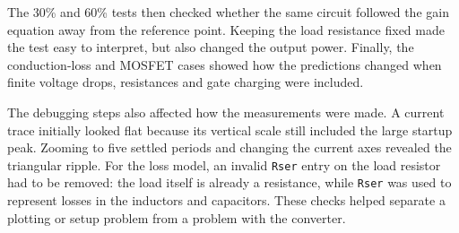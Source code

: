 \documentclass[11pt,a4paper]{article}
\begin{document}
The 30\% and 60\% tests then checked whether the same circuit followed the gain equation away from the reference point. Keeping the load resistance fixed made the test easy to interpret, but also changed the output power. Finally, the conduction-loss and MOSFET cases showed how the predictions changed when finite voltage drops, resistances and gate charging were included.

The debugging steps also affected how the measurements were made. A current trace initially looked flat because its vertical scale still included the large startup peak. Zooming to five settled periods and changing the current axes revealed the triangular ripple. For the loss model, an invalid \texttt{Rser} entry on the load resistor had to be removed: the load itself is already a resistance, while \texttt{Rser} was used to represent losses in the inductors and capacitors. These checks helped separate a plotting or setup problem from a problem with the converter.
\clearpage
\end{document}
